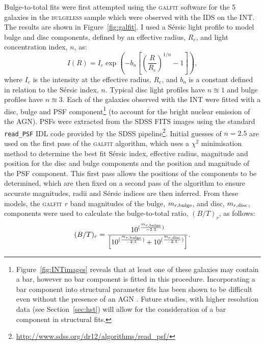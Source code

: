 {Bulge-to-total fits were first attempted using the \textsc{galfit} software \citep{peng02} for the 5 galaxies in the \textsc{bulgeless} sample which were observed with the IDS on the INT. The results are shown in Figure~\ref{fig:galfit}. I used a S\'ersic light profile \citep{sersic68} to model bulge and disc components, defined by an effective radius, $R_e$, and light concentration index, $n$, as:
\begin{equation}\label{sersic}
I(R) = I_e \exp \left(  -b_n \left[  \left( \frac{R}{R_e}\right)^{1/n} -1 \right] \right),
\end{equation}
where $I_e$ is the intensity at the effective radius, $R_e$, and $b_n$ is a constant defined in relation to the S\'ersic index, $n$. Typical disc light profiles have $n\approxeq1$ and bulge profiles have $n\approxeq3$. Each of the galaxies observed with the INT were fitted with a disc, bulge and PSF component\footnote{Figure~\ref{fig:INTimages} reveals that at least one of these galaxies may contain a bar, however no bar component is fitted in this procedure. Incorporating a bar component into structural parameter fits has been shown to be difficult even without the presence of an AGN \citep{kruk16}. Future studies, with higher resolution data (see Section~\ref{sec:hst}) will allow for the consideration of a bar component in structural fits.} (to account for the bright nuclear emission of the AGN). PSFs were extracted from the SDSS FITS images using the standard \texttt{read\_PSF} IDL code provided by the SDSS pipeline\footnote{\url{http://www.sdss.org/dr12/algorithms/read_psf/}}. Initial guesses of $n=2.5$ are used on the first pass of the \textsc{galfit} algorithm, which uses a $\chi^2$ minimisation method to determine the best fit S\'ersic index, effective radius, magnitude and position for the disc and bulge components and the position and magnitude of the PSF component. This first pass allows the positions of the components to be determined, which are then fixed on a second pass of the algorithm to ensure accurate magnitudes, radii and S\'ersic indices are then inferred. From these models, the \textsc{galfit} $r$ band magnitudes of the bulge, $m_{r, \rm{bulge}}$, and disc, $m_{r, \rm{disc}}$, components were used to calculate the bulge-to-total ratio, $(B/T)_r$, as follows:
\begin{equation}\label{btratio}
(B/T)_r = \frac{10^{(\frac{m_{r, \rm{bulge}}}{-2.5})}}{\left[10^{(\frac{m_{r, \rm{bulge}}}{-2.5})} + 10^{(\frac{m_{r, \rm{disc}}}{-2.5})}\right]}.
\end{equation}

}
